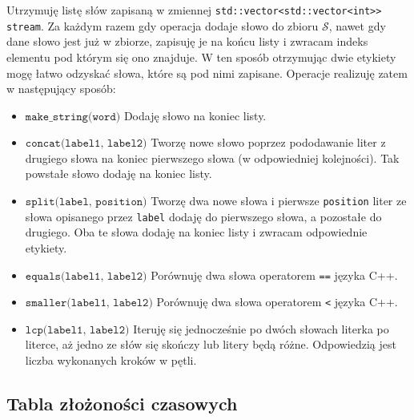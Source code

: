 \documentclass[declaration,shortabstract]{iithesis}
\theoremstyle{definition} \newtheorem{definition}{Definicja}[chapter]
\theoremstyle{remark} \newtheorem{remark}[definition]{Obserwacja}
\theoremstyle{plain} \newtheorem{theorem}[definition]{Twierdzenie}
\theoremstyle{remark} \newtheorem{example}{Przykład}[definition]
\theoremstyle{plain} \newtheorem{lemma}[definition]{Lemat}
\begin{document}
Utrzymuję listę słów zapisaną w zmiennej \texttt{std::vector<std::vector<int>> stream}. Za każdym razem gdy operacja dodaje słowo do zbioru $\mathcal{S}$, nawet gdy dane słowo jest już w zbiorze, zapisuję je na końcu listy i zwracam indeks elementu pod którym się ono znajduje. W ten sposób otrzymując dwie etykiety mogę łatwo odzyskać słowa, które są pod nimi zapisane. Operacje realizuję zatem w następujący sposób:
\begin{itemize}
    \item $\texttt{make\_string(word)}$ Dodaję słowo na koniec listy.
    \item $\texttt{concat(label1, label2)}$ Tworzę nowe słowo poprzez pododawanie liter z drugiego słowa na koniec pierwszego słowa (w odpowiedniej kolejności). Tak powstałe słowo dodaję na koniec listy. 
    \item $\texttt{split(label, position)}$ Tworzę dwa nowe słowa i pierwsze \texttt{position} liter ze słowa opisanego przez \texttt{label} dodaję do pierwszego słowa, a pozostałe do drugiego. Oba te słowa dodaję na koniec listy i zwracam odpowiednie etykiety.
    \item $\texttt{equals(label1, label2)}$ Porównuję dwa słowa operatorem \texttt{==} języka C++.
    \item $\texttt{smaller(label1, label2)}$ Porównuję dwa słowa operatorem \texttt{<} języka C++.
    \item $\texttt{lcp(label1, label2)}$ Iteruję się jednocześnie po dwóch słowach literka po literce, aż jedno ze słów się skończy lub litery będą różne. Odpowiedzią jest liczba wykonanych kroków w pętli.
\end{itemize}

\subsection{Tabla złożoności czasowych}
\end{document}

